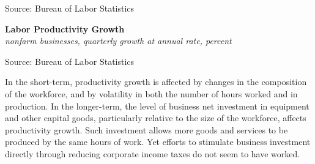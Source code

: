 \documentclass{report}
\makeatletter
\newcommand{\tbllink}[1]{\href{https://raw.githubusercontent.com/bdecon/US-chartbook/master/chartbook/data/#1}{\faTable}}
\newcommand*\short[1]{\expandafter\@gobbletwo\number\numexpr#1\relax}
\newcommand{\sbar}[4]{
		\addplot[ybar stacked, bar width=2.3pt, draw opacity=0, fill=#1] 
			table [x=#2, y=#3, col sep=comma]{#4};}
\newcommand{\absnode}[3]{\node[below right, align=left] at (axis cs: #1,#2) {#3};}
\newcommand{\dateaxisticks}{
		date coordinates in=x, axis line style={draw=none},
		xmax={2024-01-31},
		max space between ticks=40,	    
		xtick={{1990-01-01}, {1992-01-01}, {1994-01-01}, 
			{1996-01-01}, {1998-01-01}, {2000-01-01}, 
			{2002-01-01}, {2004-01-01}, {2006-01-01},
			{2008-01-01}, {2010-01-01}, {2012-01-01}, {2014-01-01},
		    {2016-01-01}, {2018-01-01}, {2020-01-01}, {2022-01-01}, 
		    {2024-01-01}, {2026-01-01}},
		minor xtick={{1989-01-01}, {1991-01-01}, {1993-01-01},
			{1995-01-01}, {1997-01-01}, {1999-01-01}, 
			{2001-01-01}, {2003-01-01}, {2005-01-01}, {2007-01-01},
		    {2009-01-01}, {2011-01-01}, {2013-01-01}, {2015-01-01},
		    {2017-01-01}, {2019-01-01}, {2021-01-01}, {2023-01-01}, 
		    {2025-01-01}, {2027-01-01}},
		enlarge y limits={0.06}, enlarge x limits={0.01},
		xticklabel style={align=center, yshift=-2pt}, tick label style={inner sep=0pt},
		}
\newcommand{\shdateaxisticks}{
		date coordinates in=x, axis line style={draw=none},
		xmax={2024-01-31},
		max space between ticks=40,	    
		xtick={{1990-01-01}, {1995-01-01}, {2000-01-01}, 
			{2005-01-01}, {2010-01-01}, {2015-01-01}, {2020-01-01}},
		minor xtick={},
		enlarge y limits={0.06}, enlarge x limits={0.01},
		xticklabel style={align=center, yshift=-2pt}, tick label style={inner sep=0pt},
		}
\newcommand{\bbar}[2]{extra #1 ticks = {{#2}}, extra #1 tick labels = ,
		extra #1 tick style = {grid=major, grid style={thick, black!25}},}
\newcommand{\stdline}[4]{\addplot[very thick, no markers, color=#1] 
		table [x=#2, y=#3, col sep=comma] {#4};	}
\newcommand{\thickline}[4]{\addplot[ultra thick, no markers, color=#1] 
		table [x=#2, y=#3, col sep=comma] {#4};	}
\newcommand{\rbars}{
		\fill[color=black!10] (axis cs:{1990-07-01},\pgfkeysvalueof{/pgfplots/ymin})
			rectangle (axis cs:{1991-03-01}, \pgfkeysvalueof{/pgfplots/ymax});
		\fill[color=black!10] (axis cs:{2007-12-01},\pgfkeysvalueof{/pgfplots/ymin})
			rectangle (axis cs:{2009-07-01}, \pgfkeysvalueof{/pgfplots/ymax});
		\fill[color=black!10] (axis cs:{2001-03-01},\pgfkeysvalueof{/pgfplots/ymin})
			rectangle (axis cs:{2001-11-01}, \pgfkeysvalueof{/pgfplots/ymax});
		\fill[color=black!10] (axis cs:{2020-02-01},\pgfkeysvalueof{/pgfplots/ymin})
			rectangle (axis cs:{2020-05-01}, \pgfkeysvalueof{/pgfplots/ymax});}
\makeatother
\begin{document}
{\begin{minipage}{0.37\textwidth}
\hspace{2mm} 

\footnotesize{Source: Bureau of Labor Statistics} \hfill \tbllink{prod_st_lt.csv}
\end{minipage} 
\vspace{1mm}

\begin{minipage}{1.0\textwidth}
\small 

\normalsize \textbf{Labor Productivity Growth}\\
\footnotesize{\textit{nonfarm businesses, quarterly growth at annual rate, percent}}
\vspace{3.65cm}

\hspace{3mm} 

\footnotesize{Source: Bureau of Labor Statistics} \hfill \tbllink{lprod.csv}
\vspace{1mm}

\small In the short-term, productivity growth is affected by changes in the composition of the workforce, and by volatility in both the number of hours worked and in production. In the longer-term, the level of business net investment in equipment and other capital goods, particularly relative to the size of the workforce, affects productivity growth. Such investment allows more goods and services to be produced by the same hours of work. Yet efforts to stimulate business investment directly through reducing corporate income taxes do not seem to have worked. 


\end{minipage}}
\end{document}
